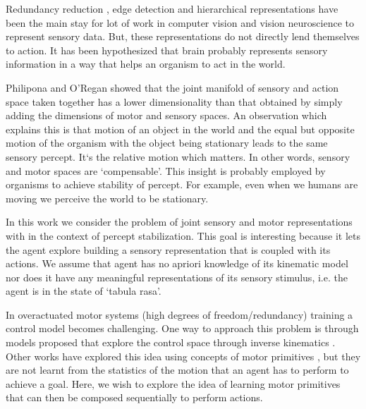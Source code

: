 \documentclass[conference]{IEEEtran}
\begin{document}

\IEEEpeerreviewmaketitle

Redundancy reduction \cite{barlow1961possible}, edge detection \cite{hubel1968receptive}  and hierarchical representations \cite{krizhevsky2012imagenet} have been the main stay for lot of work in computer vision and vision neuroscience to represent sensory data. But, these representations do not directly lend themselves to action. It has been hypothesized \cite{o2001sensorimotor} that brain probably represents sensory information in a way that helps an organism to act in the world.  

Philipona and O'Regan \cite{philipona2003there,philipona2003perception} showed that the joint manifold of sensory and action space taken together has a lower dimensionality than that obtained by simply adding the dimensions of motor and sensory spaces. An observation which explains this is that motion of an object in the world and the equal but opposite motion of the organism with the object being stationary leads to the same sensory percept. It`s the relative motion which matters. In other words, sensory and motor spaces are `compensable'. This insight is probably employed by organisms to achieve stability of percept. For example, even when we humans are moving we perceive the world to be stationary. 


In this work we consider the problem of joint sensory and motor representations with in the context of percept stabilization.  This goal is interesting because it lets the agent explore building a sensory representation that is coupled with its actions. We assume that agent has no apriori knowledge of its kinematic model nor does it have any meaningful representations of its sensory stimulus, i.e. the agent is in the state of `tabula rasa'.  


In overactuated motor systems (high degrees of freedom/redundancy) training a control model becomes challenging. One way to approach this problem is through models proposed that explore the control space through inverse kinematics \cite{rolf2012efficient}. Other works have explored this idea using concepts of motor primitives \cite{schaal2005learning} , but they are not learnt from the statistics of the motion that an agent has to perform to achieve a goal.  Here, we wish to explore the idea of learning motor primitives that can then be composed sequentially to perform actions.
\end{document}
